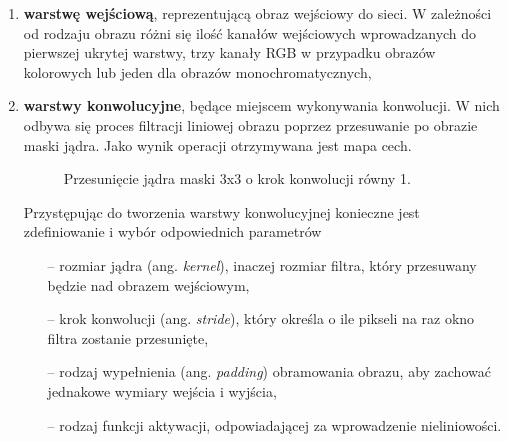 \begin{enumerate}
    \item \textbf{warstwę wejściową}, reprezentującą obraz wejściowy do sieci. W zależności od rodzaju obrazu różni się ilość kanałów wejściowych wprowadzanych do pierwszej ukrytej warstwy, trzy kanały RGB w przypadku obrazów kolorowych lub jeden dla obrazów monochromatycznych,
    
    \item \textbf{warstwy konwolucyjne}, będące miejscem wykonywania konwolucji. W nich odbywa się  proces filtracji liniowej obrazu poprzez przesuwanie po obrazie maski jądra. Jako wynik operacji otrzymywana jest mapa cech.
        
        \begin{figure}[H]
        \centering
        \hspace{0.5cm}
        \hfill
        \caption{Przesunięcie jądra maski 3x3 o krok konwolucji równy 1.}
        \label{fig:test}
        \end{figure}
        
        Przystępując do tworzenia warstwy konwolucyjnej konieczne jest zdefiniowanie i wybór odpowiednich parametrów 
        \begin{itemize}
            \item[--] rozmiar jądra (ang. \textit{kernel}), inaczej rozmiar filtra, który przesuwany będzie nad obrazem     wejściowym,
            \item[--] krok konwolucji (ang. \textit{stride}), który określa o ile pikseli na raz okno filtra zostanie     przesunięte,
            \item[--] rodzaj wypełnienia (ang. \textit{padding}) obramowania obrazu, aby zachować jednakowe wymiary     wejścia i wyjścia,
            \item[--] rodzaj funkcji aktywacji, odpowiadającej za wprowadzenie nieliniowości.
        \end{itemize}
    

\end{enumerate}
